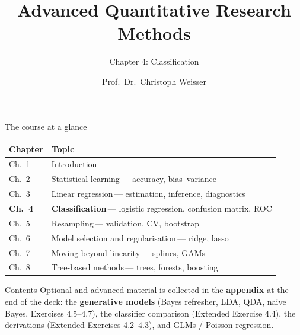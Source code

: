 \documentclass[aspectratio=169,11pt]{beamer}
\title{Advanced Quantitative Research Methods}
\subtitle{Chapter 4: Classification}
\author{Prof.\ Dr.\ Christoph Weisser}
\date{}\graphicspath{{images/}}
\begin{document}
\begin{frame}[plain]\titlepage\end{frame}

\begin{frame}{The course at a glance}
  \vspace{-1.5mm}
  \begin{center}
  \scriptsize
  \setlength{\tabcolsep}{5pt}
  \renewcommand{\arraystretch}{1.30}
  \begin{tabular}{@{\hspace{2pt}}l >{\raggedright\arraybackslash}p{}@{\hspace{2pt}}}
    \toprule
    \textbf{Chapter} & \textbf{Topic} \\
    \midrule
     {\color{accent}Ch.\ 1} & Introduction \\
    \rowcolor{black!3} {\color{accent}Ch.\ 2} & Statistical learning\,{\color{black!45}--- accuracy, bias--variance} \\
     {\color{accent}Ch.\ 3} & Linear regression\,{\color{black!45}--- estimation, inference, diagnostics} \\
    \rowcolor{accent!18} \textbf{Ch.\ 4} & \textbf{Classification}\,{\color{accent!75!black}--- logistic regression, confusion matrix, ROC} \\
     {\color{accent}Ch.\ 5} & Resampling\,{\color{black!45}--- validation, CV, bootstrap} \\
    \rowcolor{black!3} {\color{accent}Ch.\ 6} & Model selection and regularisation\,{\color{black!45}--- ridge, lasso} \\
     {\color{accent}Ch.\ 7} & Moving beyond linearity\,{\color{black!45}--- splines, GAMs} \\
    \rowcolor{black!3} {\color{accent}Ch.\ 8} & Tree-based methods\,{\color{black!45}--- trees, forests, boosting} \\
    \bottomrule
  \end{tabular}
  \end{center}
\end{frame}


\begin{frame}{Contents}\small
  \tableofcontents[hideallsubsections]
  \vfill
  {\tiny Optional and advanced material is collected in the \textbf{appendix} at the end of the
  deck: the \textbf{generative models} (Bayes refresher, LDA, QDA, naive Bayes, Exercises
  4.5--4.7), the classifier comparison (Extended Exercise 4.4), the derivations
  (Extended Exercises 4.2--4.3), and GLMs / Poisson regression.}
\end{frame}
\end{document}
